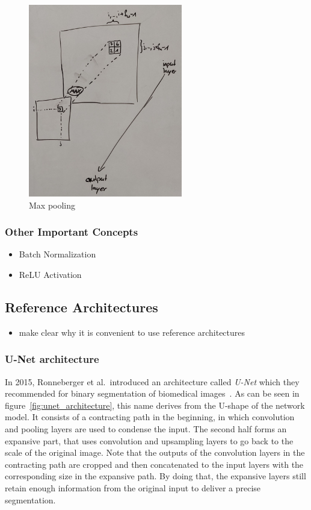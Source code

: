 \begin{figure}[h]
    \centering
    \includegraphics[width=0.6\textwidth]{images/maxpool}
    \caption{Max pooling }
    \label{fig:pooling}
\end{figure}

\subsubsection{Other Important Concepts}
\begin{itemize}
    \item Batch Normalization
    \item ReLU Activation
\end{itemize}

\subsection{Reference Architectures}
\begin{itemize}
    \item make clear why it is convenient to use reference architectures
\end{itemize}

\subsubsection{U-Net architecture}
In 2015, Ronneberger et al.\ introduced an architecture called \emph{U-Net} which they recommended for binary segmentation of biomedical images~\cite{unet15}. As can be seen in figure~\ref{fig:unet_architecture}, this name derives from the U-shape of the network model. It consists of a contracting path in the beginning, in which convolution and pooling layers are used to condense the input. The second half forms an expansive part, that uses convolution and upsampling layers to go back to the scale of the original image. Note that the outputs of the convolution layers in the contracting path are cropped and then concatenated to the input layers with the corresponding size in the expansive path. By doing that, the expansive layers still retain enough information from the original input to deliver a precise segmentation.

